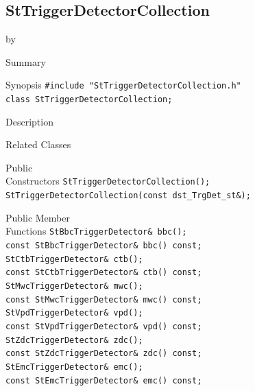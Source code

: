\documentclass[twoside]{article}
\newcommand{\entrylabel}[1]{\mbox{\textbf{{#1}}}\hfil}%
\newenvironment{entry}
{\begin{list}{}%
    {\renewcommand{\makelabel}{\entrylabel}%
     \setlength{\labelwidth}{90pt}%
     \setlength{\leftmargin}{\labelwidth}
     \advance\leftmargin by \labelsep%
      }%
    }%
  {\end{list}}
\newcommand{\Entrylabel}[1]%
{\raisebox{0pt}[1ex][0pt]{\makebox[\labelwidth][l]%
    {\parbox[t]{\labelwidth}{\hspace{0pt}\textbf{{#1}}}}}}
\newenvironment{Entry}%
{\renewcommand{\entrylabel}{\Entrylabel}\begin{entry}}%
  {\end{entry}}
\begin{document}
\subsection{StTriggerDetectorCollection}
\label{sec:StTriggerDetectorCollection}
\begin{Entry}
\item[Summary]
\item[Synopsis]
    \verb+#include "StTriggerDetectorCollection.h"+\\
    \verb+class StTriggerDetectorCollection;+\\
\item[Description]
\item[Related Classes]
\item[Public\\ Constructors]
    \verb+StTriggerDetectorCollection();+\\
    \verb+StTriggerDetectorCollection(const dst_TrgDet_st&);+\\
    
\item[Public Member\\ Functions]
    \verb+StBbcTriggerDetector& bbc();+\\
    \verb+const StBbcTriggerDetector& bbc() const;+\\
    \verb+StCtbTriggerDetector& ctb();+\\
    \verb+const StCtbTriggerDetector& ctb() const;+\\
    \verb+StMwcTriggerDetector& mwc();+\\
    \verb+const StMwcTriggerDetector& mwc() const;+\\
    \verb+StVpdTriggerDetector& vpd();+\\
    \verb+const StVpdTriggerDetector& vpd() const;+\\
    \verb+StZdcTriggerDetector& zdc();+\\
    \verb+const StZdcTriggerDetector& zdc() const;+\\
    \verb+StEmcTriggerDetector& emc();+\\
    \verb+const StEmcTriggerDetector& emc() const;+\\
\end{Entry}
\clearpage
\end{document}
